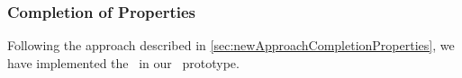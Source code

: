 \subsubsection{Completion of Properties}
\label{sec:impl:completionOfProperties}

    Following the approach described in \autoref{sec:newApproachCompletionProperties}, we have implemented the \completionOfProperties~in our \graallsp~prototype.

